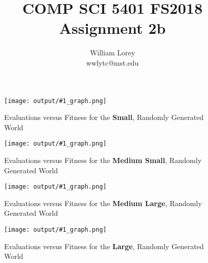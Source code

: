 \documentclass[11pt]{article}
\title{COMP SCI 5401 FS2018 Assignment 2b}
\author{William  Lorey \\ wwlytc@mst.edu}
\date{}
\newcommand{\fitnessplotcaption}[1]{\caption{Evaluations versus Fitness for the \textbf{{#1}}, Randomly Generated World}}
\newcommand{\addgraphic}[1]{\centerline{\texttt{[image: output/\#1\_graph.png]}}}
\begin{document}
\maketitle

\begin{figure}[H]
    \addgraphic{small}
    \fitnessplotcaption{Small}
    \label{fig:small}
\end{figure}

\begin{figure}[H]
    \addgraphic{med_small}
    \fitnessplotcaption{Medium Small}
    \label{fig:med_small}
\end{figure}

\begin{figure}[H]
    \addgraphic{med_large}
    \fitnessplotcaption{Medium Large}
    \label{fig:med_large}
\end{figure}

\begin{figure}[H]
    \addgraphic{large}
    \fitnessplotcaption{Large}
    \label{fig:large}
\end{figure}
\end{document}
